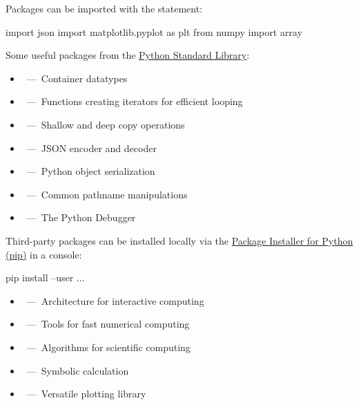 \documentclass[rules]{cheatsheet}
\begin{document}
Packages can be imported with the  statement:
\begin{python}
  import json
  import matplotlib.pyplot as plt
  from numpy import array
\end{python}

Some useful packages from the \href{https://docs.python.org/3/library/}{Python Standard Library}:

\begin{itemize}
  \item \href{https://docs.python.org/3/library/collections.html}%
    {}~---~Container datatypes
  \item \href{https://docs.python.org/3/library/itertools.html}%
    {}~---~Functions creating iterators for efficient looping
  \item \href{https://docs.python.org/3/library/copy.html}%
    {}~---~Shallow and deep copy operations
  \item \href{https://docs.python.org/3/library/json.html}%
    {}~---~JSON encoder and decoder
  \item \href{https://docs.python.org/3/library/pickle.html}%
    {}~---~Python object serialization
  \item \href{https://docs.python.org/3/library/os.path.html}%
    {}~---~Common pathname manipulations
  \item \href{https://docs.python.org/3/library/pdb.html}%
    {}~---~The Python Debugger
\end{itemize}

Third-party packages can be installed locally via the \href{https://pypi.org/project/pip/}{Package Installer for Python (pip)} in a console:
\begin{bash}
  pip install --user ...
\end{bash}

\begin{itemize}
  \item \href{https://ipython.org/}%
    {}~---~Architecture for interactive computing
  \item \href{https://www.numpy.org/}%
    {}~---~Tools for fast numerical computing
  \item \href{https://www.scipy.org/}%
    {}~---~Algorithms for scientific computing
  \item \href{https://www.sympy.org/}%
    {}~---~Symbolic calculation
  \item \href{https://matplotlib.org/}%
    {}~---~Versatile plotting library
\end{itemize}
\end{document}
